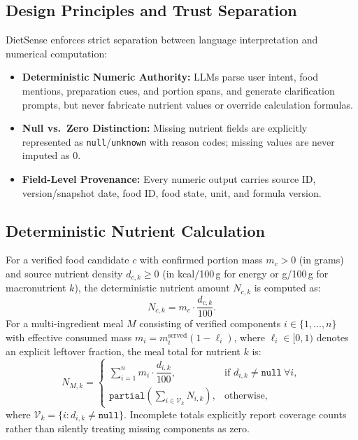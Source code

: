 \documentclass[conference]{IEEEtran}
\begin{document}
\subsection{Design Principles and Trust Separation}
DietSense enforces strict separation between language interpretation and numerical computation:
\begin{itemize}
    \item \textbf{Deterministic Numeric Authority:} LLMs parse user intent, food mentions, preparation cues, and portion spans, and generate clarification prompts, but never fabricate nutrient values or override calculation formulas.
    \item \textbf{Null vs.\ Zero Distinction:} Missing nutrient fields are explicitly represented as \texttt{null}/\texttt{unknown} with reason codes; missing values are never imputed as $0$.
    \item \textbf{Field-Level Provenance:} Every numeric output carries source ID, version/snapshot date, food ID, food state, unit, and formula version.
\end{itemize}

\subsection{Deterministic Nutrient Calculation}
For a verified food candidate $c$ with confirmed portion mass $m_c > 0$ (in grams) and source nutrient density $d_{c,k} \ge 0$ (in kcal/100\,g for energy or g/100\,g for macronutrient $k$), the deterministic nutrient amount $N_{c,k}$ is computed as:
\begin{equation}
N_{c,k} = m_c \cdot \frac{d_{c,k}}{100}.
\label{eq:scaling}
\end{equation}
For a multi-ingredient meal $M$ consisting of verified components $i \in \{1, \dots, n\}$ with effective consumed mass $m_i = m_i^{\text{served}} (1 - \ell_i)$, where $\ell_i \in [0, 1)$ denotes an explicit leftover fraction, the meal total for nutrient $k$ is:
\begin{equation}
N_{M,k} =
\begin{cases}
\sum_{i=1}^{n} m_i \cdot \dfrac{d_{i,k}}{100}, & \text{if } d_{i,k} \neq \texttt{null}\ \forall i, \\[8pt]
\texttt{partial}\!\left(\sum_{i \in \mathcal{V}_k} N_{i,k}\right), & \text{otherwise},
\end{cases}
\label{eq:aggregation}
\end{equation}
where $\mathcal{V}_k = \{i : d_{i,k} \neq \texttt{null}\}$. Incomplete totals explicitly report coverage counts rather than silently treating missing components as zero.
\end{document}
